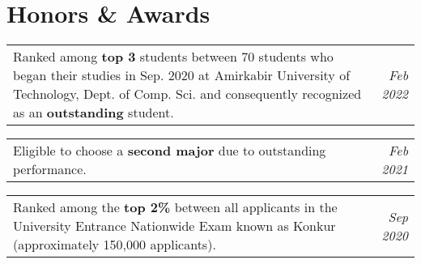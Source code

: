 
\section{Honors \& Awards} 
 
	\begin{tabularx}{\textwidth}{Xr}
		Ranked among \textbf{top 3} students between 70 students who began their studies in Sep. 2020 at Amirkabir University of Technology, Dept. of Comp. Sci. and consequently recognized as an \textbf{outstanding} student. & \textit{Feb 2022}
	\end{tabularx}
	
	\vspace{0.20cm} 
	
	\begin{tabularx}{\textwidth}{Xr}
		Eligible to choose a \textbf{second major} due to outstanding performance. & \textit{Feb 2021}
	\end{tabularx}
	
	\vspace{0.20cm}	
	
	\begin{tabularx}{\textwidth}{Xr}
		Ranked among the \textbf{top 2\%} between all applicants in the University Entrance Nationwide Exam known as Konkur (approximately 150,000 applicants). & \textit{Sep 2020}
	\end{tabularx}
	